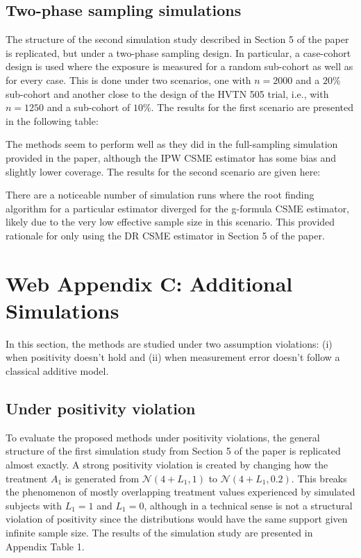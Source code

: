 \documentclass[12pt]{article}
\begin{document}
\subsection{Two-phase sampling simulations}

The structure of the second simulation study described in Section 5 of the paper is replicated, but under a two-phase sampling design. In particular, a case-cohort design is used where the exposure is measured for a random sub-cohort as well as for every case. This is done under two scenarios, one with $n=2000$ and a $20\%$ sub-cohort and another close to the design of the HVTN 505 trial, i.e., with $n=1250$ and a sub-cohort of $10\%$. The results for the first scenario are presented in the following table:

The methods seem to perform well as they did in the full-sampling simulation provided in the paper, although the IPW CSME estimator has some bias and slightly lower coverage. The results for the second scenario are given here:

There are a noticeable number of simulation runs where the root finding algorithm for a particular estimator diverged for the g-formula CSME estimator, likely due to the very low effective sample size in this scenario. This provided rationale for only using the DR CSME estimator in Section 5 of the paper.

\section{Web Appendix C: Additional Simulations}

In this section, the methods are studied under two assumption violations: (i) when positivity doesn't hold and (ii) when measurement error doesn't follow a classical additive model.

\subsection{Under positivity violation}

To evaluate the proposed methods under positivity violations, the general structure of the first simulation study from Section 5 of the paper is replicated almost exactly. A strong positivity violation is created by changing how the treatment $A_{1}$ is generated from $\mathcal{N}(4 + L_{1}, 1)$ to $\mathcal{N}(4 + L_{1}, 0.2)$. This breaks the phenomenon of mostly overlapping treatment values experienced by simulated subjects with $L_{1} = 1$ and $L_{1} = 0$, although in a technical sense is not a structural violation of positivity since the distributions would have the same support given infinite sample size. The results of the simulation study are presented in Appendix Table 1.
\end{document}
